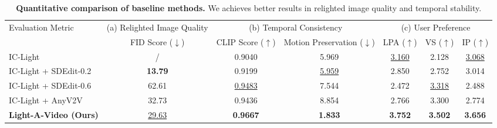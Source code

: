 \begin{table*}
\footnotesize
\centering
\begin{tabular}{lcccccc}
\toprule[1.5pt]
\multirow{2}{*}{Evaluation Metric} & \multicolumn{1}{c}{(a) Relighted Image Quality} & \multicolumn{2}{c}{(b) Temporal Consistency} & \multicolumn{3}{c}{(c) User Preference} \\ 
\cmidrule(r){2-2} \cmidrule(r){3-4} \cmidrule(r){5-7}
   & FID Score ($\downarrow$) & CLIP Score ($\uparrow$)  & Motion Preservation ($\downarrow$) & LPA ($\uparrow$)  & VS ($\uparrow$) & IP ($\uparrow$) \\ \midrule[0.5pt]
IC-Light~\citep{zhang2025scaling}    & /  & 0.9040 &  5.969 & \underline{3.160}  & 2.128  & \underline{3.068} \\
IC-Light + SDEdit-0.2 & \textbf{13.79}
  & 0.9199 & \underline{5.959} & 2.850 & 2.752 & 3.014 \\
IC-Light + SDEdit-0.6 & 62.61
  & \underline{0.9483} & 7.544 & 2.472 & \underline{3.318} & 2.488 \\
IC-Light + AnyV2V~\citep{ku2024anyv2v} & 32.73
  & 0.9436 & 8.854  & 2.766 & 3.300 & 2.774 \\
\textbf{Light-A-Video (Ours)} & \underline{29.63}
    & \textbf{0.9667} & \textbf{1.833} & \textbf{3.752}  & \textbf{3.502}  & \textbf{3.656} \\ 
 \bottomrule[1.5pt]
\end{tabular}
\centering
\vspace{-1em}
\caption{\textbf{Quantitative comparison of baseline methods.} We achieves better results in relighted image quality and temporal stability. }
\vspace{-2em}
\label{tab:quant}
\end{table*}